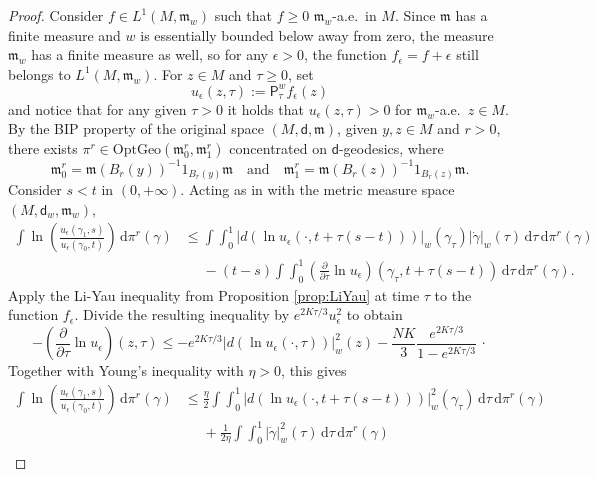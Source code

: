 \documentclass[10pt]{article}
\newcommand{\m}{\mathfrak{m}}
\renewcommand{\d}{\,\mathrm{d}}
\renewcommand{\P}{\mathsf{P}}
\newcommand{\dist}{\mathsf{d}}
\theoremstyle{plain}
\theoremstyle{definition}
\newcommand{\Lonew}{L^1(M,\m_w)}
\begin{document}
\begin{proof}







Consider $f \in \Lonew$ such that $f \ge 0$ $\m_w$-a.e.~in $M$. Since $\m$ has a finite measure and $w$ is essentially bounded below away from zero, the measure $\m_w$ has a finite measure as well, so for any $\epsilon>0$, the function $f_\epsilon = f + \epsilon$ still belongs to $\Lonew$. For $z \in M$ and $\tau \ge 0$, set $$u_\epsilon (z,\tau) := \P^w_\tau f_\epsilon (z)$$ 
and notice that for any given $\tau >0$ it holds that $u_\epsilon(z,\tau)>0$ for $\m_w$-a.e.~$z \in M$.  By the BIP property of the original space $(M,\dist,\m)$, given $y,z \in M$ and $r>0$, there exists $\pi^r \in \mathrm{OptGeo}(\m_0^r,\m_1^r)$ concentrated on $\dist$-geodesics, where $$\m_0^r =\m(B_r(y))^{-1} 1_{B_r(y)}\m  \quad \text{and} \quad  \m_1^r=\m(B_r(z))^{-1} 1_{B_r(z)}\m.$$  Consider $s<t$ in $(0,+\infty)$. Acting as in \cite[(4.11)]{GarofaloMondino-13} with the metric measure space $(M,\dist_w,\m_w)$,
\begin{align*}
    \int \ln \left( \frac{u_\epsilon(\gamma_1,s)}{u_\epsilon(\gamma_0,t)}\right) \d \pi^r(\gamma) & \le \int \int_0^1 |d(\ln u_\epsilon(\cdot,t + \tau(s-t))) |_{w}(\gamma_\tau) |\dot{\gamma}|_{w}(\tau) \d \tau \d \pi^r(\gamma) \\
    & \phantom{=} - (t-s) \int \int_0^1 \left( \frac{\partial}{\partial \tau}  \ln u_\epsilon \right) (\gamma_\tau,t + \tau(s-t)) \d \tau \d \pi^r(\gamma).
\end{align*}
Apply the Li-Yau inequality from Proposition \ref{prop:LiYau} at time $\tau$ to the function $f_\epsilon$. Divide the resulting inequality by $e^{2K\tau/3}u_\epsilon^2$ to obtain  
\begin{equation*}
- \left(\frac{\partial}{\partial \tau} \ln u_\epsilon\right) (z,\tau)
\leq -e^{2K\tau/3} |d(\ln u_\epsilon(\cdot,\tau) )|_{w}^2(z) - \frac{NK}{3}\frac{e^{2K\tau/3}}{1-e^{2K\tau/3}} \, \cdot 
\end{equation*}
Together with Young's inequality with $\eta >0$, this gives
\begin{align*}
    \int \ln \left( \frac{u_\epsilon(\gamma_1,s)}{u_\epsilon(\gamma_0,t)}\right) \d \pi^r(\gamma) 
    & 
    \le \frac{\eta}{2}\int \int_0^1 |d(\ln u_\epsilon(\cdot,t + \tau(s-t)) )|_{w}^2(\gamma_\tau)  \d \tau \d \pi^r(\gamma) \\
    &\phantom{=}  + \frac{1}{2\eta} \int \int_0^1 |\dot{\gamma}|_{w}^2(\tau) \d \tau \d \pi^r(\gamma)\\

\end{align*}
\end{proof}
\end{document}
